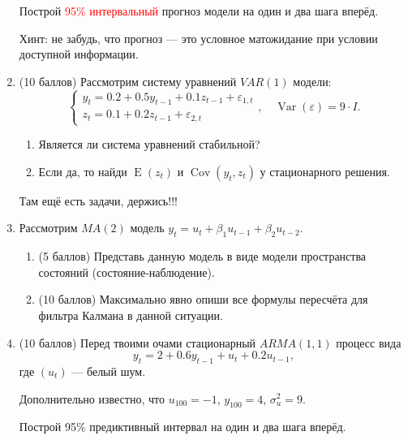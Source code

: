 \documentclass[12pt]{article}
\DeclareMathOperator{\Cov}{Cov}
\DeclareMathOperator{\Var}{Var}
\DeclareMathOperator{\E}{E}
\begin{document}
\begin{enumerate}
    Построй \textcolor{red}{95\% интервальный} прогноз модели на один и два шага вперёд.
     
    Хинт: не забудь, что прогноз — это условное матожидание при условии доступной информации.
	
	\item (10 баллов) 
	Рассмотрим систему уравнений $VAR(1)$ модели:
	\[
	\begin{cases}
		y_t = 0.2 + 0.5 y_{t-1} + 0.1 z_{t-1} + \varepsilon_{1, t}\\
		z_t = 0.1 + 0.2 z_{t-1} +  \varepsilon_{2, t} 
	\end{cases}, \quad \Var(\varepsilon) = 9\cdot I.
\]
\begin{enumerate}
    \item Является ли система уравнений стабильной?
    \item Если да, то найди $\E(z_t)$ и $\Cov(y_t, z_t)$ у стационарного решения.
\end{enumerate}

Там ещё есть задачи, держись!!!

\newpage

\item Рассмотрим $MA(2)$ модель $y_t = u_t + \beta_1 u_{t-1} + \beta_2 u_{t-2}$.
\begin{enumerate}
    \item (5 баллов) Представь данную модель в виде модели пространства состояний (состояние-наблюдение). 
    \item (10 баллов) Максимально явно опиши все формулы пересчёта для фильтра Калмана в данной ситуации.
\end{enumerate}


\item (10 баллов) Перед твоими очами стационарный $ARMA(1,1)$ процесс вида
\[
y_t = 2 + 0.6 y_{t-1} + u_t + 0.2 u_{t-1},
\]
где $(u_t)$ — белый шум. 

Дополнительно известно, что $u_{100}=-1$, $y_{100}=4$, $\sigma^2_u = 9$. 

Построй 95\% предиктивный интервал на один и два шага вперёд.


\end{enumerate}
\end{document}
